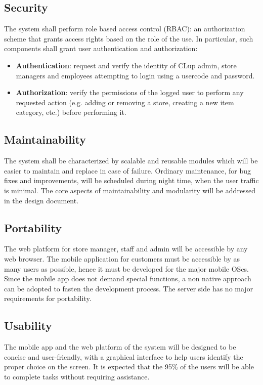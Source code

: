 \subsection{Security}
The system shall perform role based access control (RBAC): an authorization scheme that grants access rights based on the role of the use. In particular, such components shall grant user authentication and authorization:
\begin{itemize}
    \item \textbf{Authentication}: request and verify the identity of CLup admin, store managers and employees attempting to login using a usercode and password.
    \item \textbf{Authorization}: verify the permissions of the logged user to perform any requested action (e.g. adding or removing a store, creating a new item category, etc.) before performing it.
\end{itemize}

\subsection{Maintainability}
The system shall be characterized by scalable and reusable modules which will be easier to maintain and replace in case of failure. Ordinary maintenance, for bug fixes and improvements, will be scheduled during night time, when the user traffic is minimal.\newline
The core aspects of maintainability and modularity will be addressed in the design document.

\subsection{Portability}
The web platform for store manager, staff and admin will be accessible by any web browser.\newline
The mobile application for customers must be accessible by as many users as possible, hence it must be developed for the major mobile OSes. Since the mobile app does not demand special functions, a non native approach can be adopted to fasten the development process.
The server side has no major requirements for portability.

\subsection{Usability}
The mobile app and the web platform of the system will be designed to be concise and user-friendly, with a graphical interface to help users identify the proper choice on the screen. It is expected that the 95\% of the users will be able to complete tasks without requiring assistance.

